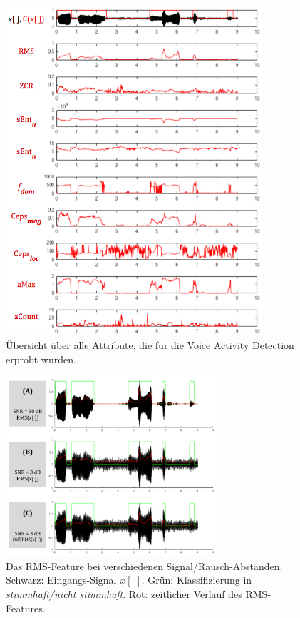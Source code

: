 \begin{figure}[H]
	\centering
	\includegraphics[width=0.85\textwidth]{bilder/allFeatures03.png}
	\caption[Übersicht über alle Attribute, die für die VAD erprobt wurden]{Übersicht über alle Attribute, die für die Voice Activity Detection erprobt wurden.}
	\label{img:vadAllFeatures}
\end{figure}

\begin{figure}[h]
	\centering
	\includegraphics[width=0.7\textwidth]{bilder/rms_diff.png}
	\caption[Das RMS-Feature bei verschiedenen Signal/Rausch-Abständen]{Das RMS-Feature bei verschiedenen Signal/Rausch-Abständen. Schwarz: Eingangs-Signal $x[\;]$. Grün: Klassifizierung in \emph{stimmhaft/nicht stimmhaft}. Rot: zeitlicher Verlauf des RMS-Features.}
	\label{img:min-signal}
\end{figure}

